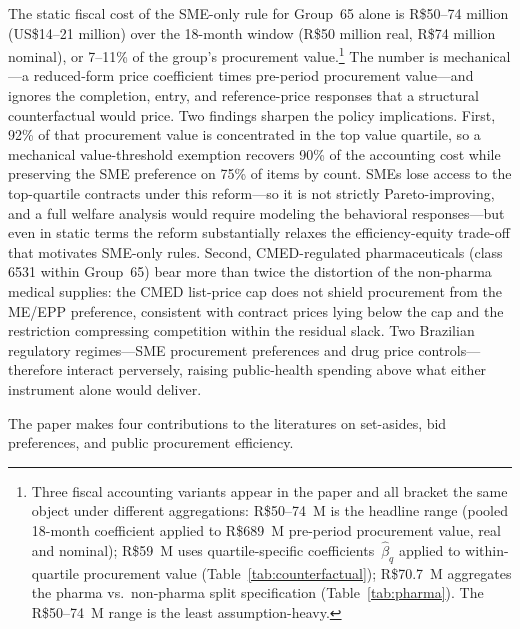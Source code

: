 The static fiscal cost of the SME-only rule for Group~65 alone is R\$50--74 million (US\$14--21 million) over the 18-month window (R\$50 million real, R\$74 million nominal), or 7--11\% of the group's procurement value.\footnote{Three fiscal accounting variants appear in the paper and all bracket the same object under different aggregations: R\$50--74~M is the headline range (pooled 18-month coefficient applied to R\$689~M pre-period procurement value, real and nominal); R\$59~M uses quartile-specific coefficients~$\hat\beta_q$ applied to within-quartile procurement value (Table~\ref{tab:counterfactual}); R\$70.7~M aggregates the pharma vs.\ non-pharma split specification (Table~\ref{tab:pharma}). The R\$50--74~M range is the least assumption-heavy.} The number is mechanical---a reduced-form price coefficient times pre-period procurement value---and ignores the completion, entry, and reference-price responses that a structural counterfactual would price. Two findings sharpen the policy implications. First, 92\% of that procurement value is concentrated in the top value quartile, so a mechanical value-threshold exemption recovers 90\% of the accounting cost while preserving the SME preference on 75\% of items by count. SMEs lose access to the top-quartile contracts under this reform---so it is not strictly Pareto-improving, and a full welfare analysis would require modeling the behavioral responses---but even in static terms the reform substantially relaxes the efficiency-equity trade-off that motivates SME-only rules. Second, CMED-regulated pharmaceuticals (class 6531 within Group~65) bear more than twice the distortion of the non-pharma medical supplies: the CMED list-price cap does not shield procurement from the ME/EPP preference, consistent with contract prices lying below the cap and the restriction compressing competition within the residual slack. Two Brazilian regulatory regimes---SME procurement preferences and drug price controls---therefore interact perversely, raising public-health spending above what either instrument alone would deliver.

The paper makes four contributions to the literatures on set-asides, bid preferences, and public procurement efficiency.

